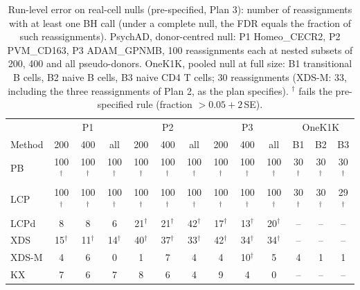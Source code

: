 \begin{table}[t]\centering\small\setlength{\tabcolsep}{2.6pt}
\caption{Run-level error on real-cell nulls (pre-specified, Plan 3): number of reassignments with at least one BH call (under a complete null, the FDR equals the fraction of such reassignments). PsychAD, donor-centred null: P1 Homeo\_CECR2, P2 PVM\_CD163, P3 ADAM\_GPNMB, 100 reassignments each at nested subsets of 200, 400 and all pseudo-donors. OneK1K, pooled null at full size: B1 transitional B cells, B2 naive B cells, B3 naive CD4 T cells; 30 reassignments (XDS-M: 33, including the three reassignments of Plan 2, as the plan specifies). $^\dagger$ fails the pre-specified rule (fraction $>0.05+2$\,SE).}\label{tab:runlevel}
\begin{tabular}{lccccccccc|ccc}\toprule
 & \multicolumn{3}{c}{P1} & \multicolumn{3}{c}{P2} & \multicolumn{3}{c}{P3} & \multicolumn{3}{c}{OneK1K}\\
Method & 200 & 400 & all & 200 & 400 & all & 200 & 400 & all & B1 & B2 & B3\\\midrule
PB & 100$^\dagger$ & 100$^\dagger$ & 100$^\dagger$ & 100$^\dagger$ & 100$^\dagger$ & 100$^\dagger$ & 100$^\dagger$ & 100$^\dagger$ & 100$^\dagger$ & 30$^\dagger$ & 30$^\dagger$ & 30$^\dagger$\\
LCP & 100$^\dagger$ & 100$^\dagger$ & 100$^\dagger$ & 100$^\dagger$ & 100$^\dagger$ & 100$^\dagger$ & 100$^\dagger$ & 100$^\dagger$ & 100$^\dagger$ & 30$^\dagger$ & 30$^\dagger$ & 29$^\dagger$\\
LCPd & 8 & 8 & 6 & 21$^\dagger$ & 21$^\dagger$ & 42$^\dagger$ & 17$^\dagger$ & 13$^\dagger$ & 20$^\dagger$ & -- & -- & --\\
XDS & 15$^\dagger$ & 11$^\dagger$ & 14$^\dagger$ & 40$^\dagger$ & 37$^\dagger$ & 33$^\dagger$ & 42$^\dagger$ & 34$^\dagger$ & 34$^\dagger$ & -- & -- & --\\
XDS-M & 4 & 6 & 0 & 1 & 7 & 4 & 4 & 10$^\dagger$ & 5 & 4 & 1 & 1\\
KX & 7 & 6 & 7 & 8 & 6 & 4 & 9 & 4 & 0 & -- & -- & --\\
\bottomrule\end{tabular}\end{table}
